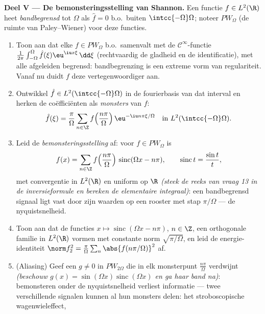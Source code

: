 \begin{problem}[{Weekendopgave --- $\partial_tu =
\partial^2_{xx}u$, van begin tot eind opgelost}]
\medskip
\noindent\textbf{Deel V --- De bemonsteringsstelling van
Shannon.} Een functie $f \in L^2(\R)$ heet
\emph{bandbegrensd} tot $\Omega$ als $\hat f = 0$ b.o.\ buiten
$\intcc{-\Omega}\Omega$; noteer $PW_\Omega$ (de ruimte van
Paley--Wiener) voor deze functies.
\begin{enumerate}[resume]
  \item Toon aan dat elke $f \in PW_\Omega$ b.o.\ samenvalt met de
        $\mathcal C^\infty$-functie
        $\frac1{2\pi}\int_{-\Omega}^{\Omega}\hat f(\xi)\eu^{\iu
        x\xi}\,\dd\xi$ (rechtvaardig de gladheid en de
        identificatie), met alle afgeleiden begrensd:
        bandbegrenzing is een extreme vorm van regulariteit.
        Vanaf nu duidt $f$ deze vertegenwoordiger aan.
  \item Ontwikkel $\hat f \in L^2(\intcc{-\Omega}\Omega)$ in de
        fourierbasis van dat interval en herken de coëfficiënten
        als \emph{monsters} van $f$:
        \[
        \hat f(\xi) = \frac\pi\Omega\sum_{n\in\Z}
        f\Bigl(\frac{n\pi}\Omega\Bigr)\,
        \eu^{-\iu n\pi\xi/\Omega}
        \quad\text{in } L^2(\intcc{-\Omega}\Omega) .
        \]
  \item Leid de \emph{bemonsteringsstelling} af: voor $f \in
        PW_\Omega$ is
        \[
        f(x) = \sum_{n\in\Z}f\Bigl(\frac{n\pi}
        \Omega\Bigr)\,\operatorname{sinc}(\Omega x - n\pi),
        \qquad \operatorname{sinc}t = \frac{\sin t}t,
        \]
        met convergentie in $L^2(\R)$ en uniform op $\R$
        \emph{(steek de reeks van vraag 13 in de inversieformule
        en bereken de elementaire integraal)}: een bandbegrensd
        signaal ligt  vast door zijn waarden op een
        rooster met stap $\pi/\Omega$ --- de nyquistsnelheid.
  \item Toon aan dat de functies $x \mapsto
        \operatorname{sinc}(\Omega x - n\pi)$, $n \in \Z$, een
        orthogonale familie in $L^2(\R)$ vormen met constante
        norm $\sqrt{\pi/\Omega}$, en leid de energie-identiteit
        $\norm f_2^2 = \frac\pi\Omega\sum_n\abs{f(n\pi/\Omega)}^2$
        af.
  \item (Aliasing) Geef een $g \neq 0$ in $PW_{2\Omega}$ die in
        elk monsterpunt $\frac{n\pi}\Omega$ verdwijnt
        \emph{(beschouw $g(x) = \sin(\Omega
        x)\operatorname{sinc}(\Omega x)$ en ga haar band na)}:
        bemonsteren onder de nyquistsnelheid verliest informatie
        --- twee verschillende signalen kunnen al hun monsters
        delen: het stroboscopische wagenwieleffect,

\end{enumerate}
\end{problem}
